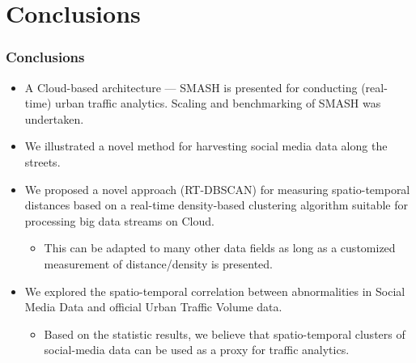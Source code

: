 \section{Conclusions}
\begin{frame}
    \frametitle{Conclusions}
    \begin{itemize} \small
	    \item A Cloud-based architecture --- SMASH is presented for conducting (real-time) urban traffic analytics. Scaling and benchmarking of SMASH was undertaken.
	    \item We illustrated a novel method for harvesting social media data along the streets.
	    \item We proposed a novel approach (RT-DBSCAN) for measuring spatio-temporal distances based on a real-time density-based clustering algorithm suitable for processing big data streams on Cloud.
	    \begin{itemize}
	        \item This can be adapted to many other data fields as long as a customized measurement of distance/density is presented.
	    \end{itemize}
	    \item We explored the spatio-temporal correlation between abnormalities in Social Media Data and official Urban Traffic Volume data. 
	    \begin{itemize}
	        \item Based on the statistic results, we believe that spatio-temporal clusters of social-media data can be used as a proxy for traffic analytics.  
	    \end{itemize}
    \end{itemize}
\end{frame}

